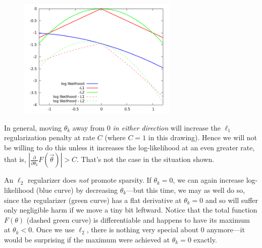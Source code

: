 \documentclass[11pt]{article}
\newcommand{\vtheta}{\vec{\theta}}
\newcommand{\diffk}{\frac{\partial}{\partial \theta_k}}
\begin{document}
\begin{figure}
\includegraphics[width=3in]{L1-L2}
\end{figure}

In general, moving $\theta_k$ away from 0 {\em in either direction} will increase the $\ell_1$ regularization penalty at rate $C$ (where $C=1$ in this drawing).  Hence we will not be willing to do this unless it increases the log-likelihood at an even greater rate, that is, $|\diffk F(\vtheta)| > C$.  That's not the case in the situation shown.

An $\ell_2$ regularizer does {\em not} promote sparsity.  If $\theta_k=0$, we can again increase log-likelihood (blue curve) by decreasing $\theta_k$---but this time, we may as well do so, since the regularizer (green curve) has a flat derivative at $\theta_k=0$ and so will suffer only negligible harm if we move a tiny bit leftward.  Notice that the total function $F(\theta)$ (dashed green curve) is differentiable and happens to have its maximum at $\theta_k < 0$. Once we use $\ell_2$, there is nothing very special about 0 anymore---it would be surprising if the maximum were achieved at $\theta_k=0$ exactly.
\end{document}
